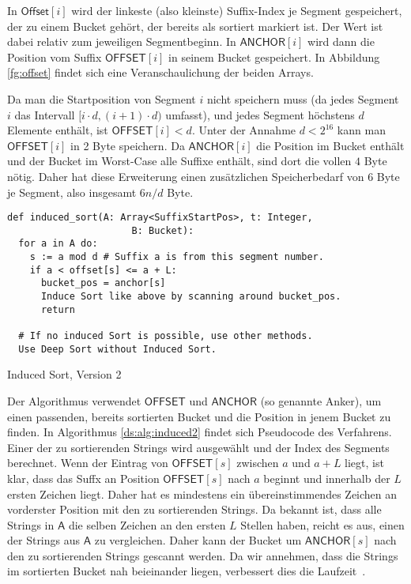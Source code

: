 In $\mathsf{Offset}[i]$ wird der linkeste (also kleinste) Suffix-Index je Segment gespeichert,
der zu einem Bucket gehört, der bereits als sortiert markiert ist.
Der Wert ist dabei relativ zum jeweiligen Segmentbeginn.
In $\mathsf{ANCHOR}[i]$ wird dann die Position vom Suffix $\mathsf{OFFSET}[i]$ in seinem Bucket gespeichert.
In Abbildung \ref{fg:offset} findet sich eine Veranschaulichung der beiden Arrays.

Da man die Startposition von Segment $i$ nicht speichern muss
(da jedes Segment $i$ das Intervall $[i\cdot d, (i + 1) \cdot d)$ umfasst),
und jedes Segment höchstens $d$ Elemente enthält, ist $\mathsf{OFFSET}[i] < d$.
Unter der Annahme $d < 2^{16}$ kann man $\mathsf{OFFSET}[i]$ in 2 Byte speichern.
Da $\mathsf{ANCHOR}[i]$ die Position im Bucket enthält und der Bucket im Worst-Case alle Suffixe enthält, sind dort die vollen $4$ Byte nötig.
Daher hat diese Erweiterung einen zusätzlichen Speicherbedarf von $6$ Byte je Segment, also insgesamt $6n/d$ Byte.

\begin{listing}
\begin{verbatim}
def induced_sort(A: Array<SuffixStartPos>, t: Integer,
                      B: Bucket):
  for a in A do:
    s := a mod d # Suffix a is from this segment number.
    if a < offset[s] <= a + L:
      bucket_pos = anchor[s]
      Induce Sort like above by scanning around bucket_pos.
      return

  # If no induced Sort is possible, use other methods.
  Use Deep Sort without Induced Sort.
\end{verbatim}
\caption{Induced Sort, Version 2~\cite{saca:4}}
\label{ds:alg:induced2}
\end{listing}

Der Algorithmus verwendet $\mathsf{OFFSET}$ und $\mathsf{ANCHOR}$ (so genannte Anker), um einen passenden, bereits sortierten Bucket und die Position in jenem Bucket zu finden.
In Algorithmus \ref{ds:alg:induced2} findet sich Pseudocode des Verfahrens.
Einer der zu sortierenden Strings wird ausgewählt und der Index des Segments berechnet.
Wenn der Eintrag von $\mathsf{OFFSET}[s]$ zwischen $a$ und $a+L$ liegt, ist klar, dass das Suffx an Position $\mathsf{OFFSET}[s]$ nach $a$ beginnt und innerhalb der $L$ ersten Zeichen liegt.
Daher hat es mindestens ein übereinstimmendes Zeichen an vorderster Position mit den zu sortierenden Strings.
Da bekannt ist, dass alle Strings in $\mathsf A$ die selben Zeichen an den ersten $L$ Stellen haben, reicht es aus, einen der Strings aus $\mathsf{A}$ zu vergleichen.
Daher kann der Bucket um $\mathsf{ANCHOR}[s]$ nach den zu sortierenden Strings gescannt werden.
Da wir annehmen, dass die Strings im sortierten Bucket nah beieinander liegen, verbessert dies die Laufzeit~\cite{saca:4}.

